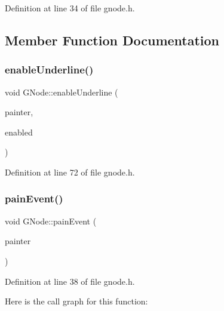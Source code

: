 Definition at line 34 of file gnode.\+h.



\subsection{Member Function Documentation}
\mbox{\label{struct_g_node_a1828c2a21037df0a85be72c1c65266dd}} 
\subsubsection{\texorpdfstring{enable\+Underline()}{enableUnderline()}}
{\footnotesize\ttfamily void G\+Node\+::enable\+Underline (\begin{DoxyParamCaption}\item[{Q\+Painter \&}]{painter,  }\item[{const bool \&}]{enabled }\end{DoxyParamCaption})\hspace{0.3cm}{\ttfamily [inline]}}



Definition at line 72 of file gnode.\+h.

\mbox{\label{struct_g_node_a380b1efbcfae97d1746ce7f30f983742}} 
\subsubsection{\texorpdfstring{pain\+Event()}{painEvent()}}
{\footnotesize\ttfamily void G\+Node\+::pain\+Event (\begin{DoxyParamCaption}\item[{Q\+Painter \&}]{painter }\end{DoxyParamCaption})\hspace{0.3cm}{\ttfamily [inline]}}



Definition at line 38 of file gnode.\+h.

Here is the call graph for this function\+:
\mbox{\label{struct_g_node_a131f3025a4d61433e58b5d7dbe702820}} 
